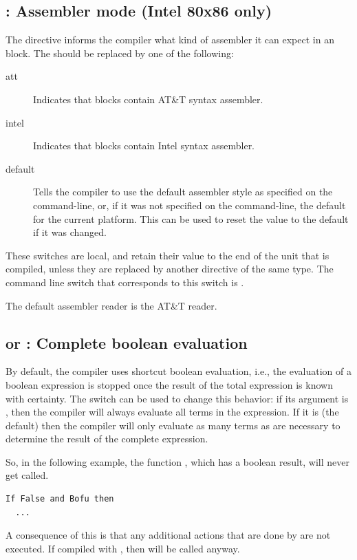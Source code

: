 \subsection{ : Assembler mode (Intel 80x86 only)}
\label{se:AsmReader}


The  directive informs the compiler what kind of assembler
it can expect in an  block. The  should be replaced by one
of the following:
\begin{description}
\item [att\ ] Indicates that  blocks contain AT\&T syntax assembler.
\item [intel\ ] Indicates that  blocks contain Intel syntax
assembler.
\item [default\ ] Tells the compiler to use the default assembler style as
specified on the command-line, or, if it was not specified on the
command-line, the default for the current platform. This can be used to reset
the value to the default if it was changed.
\end{description}
These switches are local, and retain their value to the end of the unit that
is compiled, unless they are replaced by another directive of the same type.
The command line switch that corresponds to this switch is .

The default assembler reader is the AT\&T reader.

\subsection{ or  : Complete boolean evaluation}

By default, the compiler uses shortcut boolean evaluation, i.e., the evaluation
of a boolean expression is stopped once the result of the total
expression is known with certainty. The  switch can be used
to change this behavior: if its argument is \var{+}, then the
compiler will always evaluate all terms in the expression. If it is
\var{-} (the default) then the compiler will only evaluate as many
terms as are necessary to determine the result of the complete expression.

So, in the following example, the function , which has a boolean
result, will never get called.
\begin{verbatim}
If False and Bofu then
  ...
\end{verbatim}
A consequence of this is that any additional actions that are done by
 are not executed. If compiled with , then
 will be called anyway.

